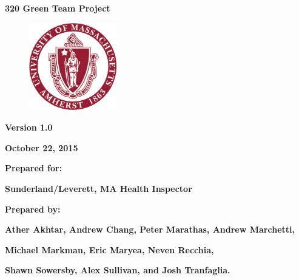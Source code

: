 \documentclass[twoside,letterpaper]{article}
\begin{document}
\clearpage\setcounter{page}{1}\pagestyle{Standard}
\thispagestyle{FirstPage}


\bigskip

{\centering{}\bfseries\color{black}
320 Green Team Project
\par}


\bigskip


\begin{figure}
\centering
\includegraphics[width=1.5in,height=1.5in]{Uma_seal.png}
\end{figure}

\bigskip


\bigskip

{\centering{}\bfseries\color{black}
Version 1.0
\par}

{\centering{}\bfseries\color{black}
October 22, 2015
\par}


\bigskip


\bigskip

{\centering{}\bfseries\color{black}
Prepared for:
\par}

{\centering{}\bfseries\color{black}
Sunderland/Leverett, MA Health Inspector
\par}


\bigskip


\bigskip

{\centering{}\bfseries\color{black}
Prepared by:
\par}

{\centering{}\bfseries\color{black}
Ather Akhtar, Andrew Chang, Peter Marathas, Andrew Marchetti, \par} 
{\centering{}\bfseries\color{black}
 Michael Markman, Eric Maryea, Neven Recchia,
\par}
{\centering{}\bfseries\color{black}
Shawn Sowersby, Alex Sullivan, and Josh Tranfaglia.\par}
\end{document}
